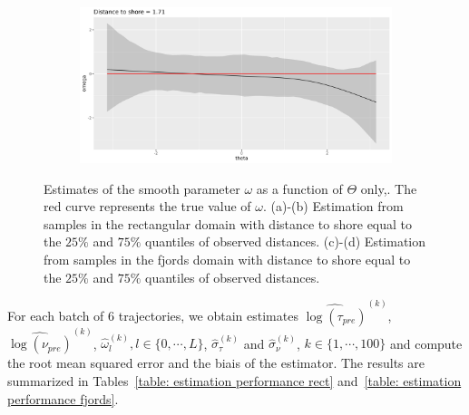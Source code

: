 \documentclass[11pt]{article}
\newcommand {\1}{\mathbb{1}}
\begin{document}
\begin{figure}[H]
\begin{subfigure}{0.48\textwidth}
		\caption{}
	\end{subfigure}
	\begin{subfigure}{0.48\textwidth}
		\centering
		\includegraphics[scale=0.3]{images/simulation study/fe_crcvm_fjords_hf_ne1_omega_theta_q2_ExpShore .png}
		\caption{}
	\end{subfigure}
	\caption{Estimates of the smooth parameter $\omega$ as a function of $\Theta$ only,. The red curve represents the true value of $\omega$. (a)-(b) Estimation from samples in the rectangular domain with distance to shore equal to the $25\%$ and $75\%$ quantiles of observed distances. (c)-(d) Estimation from samples in the fjords domain with distance to shore equal to the $25\%$ and $75\%$ quantiles of observed distances. }
	\label{fig: marginal_estimates_CRCVM}
\end{figure}


For each batch of $6$ trajectories, we obtain estimates $\widehat{\log(\tau_{pre})}^{(k)}$, $\widehat{\log(\nu_{pre})}^{(k)}$, $\hat{\omega}_l^{(k)}, l \in \{0,\cdots, L\}$, $\hat{\sigma}_{\tau}^{(k)}$ and $\hat{\sigma}_{\nu}^{(k)}$, $k \in \{1,\cdots,100\}$ and compute the root mean squared error and the biais of the estimator. The results are summarized in Tables~\ref{table: estimation performance rect} and~\ref{table: estimation performance fjords}.
\end{document}
